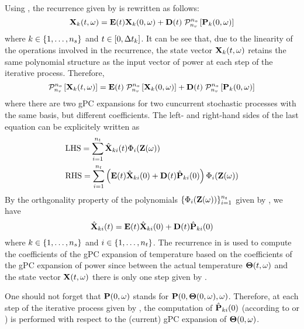 Using , the recurrence given by  is rewritten as follows:
\[
  \vX_k(\t, \o) = \mE(\t) \vX_k(0, \o) + \mD(\t) \; \oPC{\vars}{\pcorder}{\vP_k(0, \o)}
\]
where $k \in \{ 1, \dotsc, {n_s} \}$ and $t \in [0, \Delta t_k]$. It can be see that, due to the linearity of the operations involved in the recurrence, the state vector $\mathbf{X}_k(t, \omega)$ retains the same polynomial structure as the input vector of power at each step of the iterative process. Therefore,
\[
  \oPC{\vars}{\pcorder}{\vX_k(\t, \o)} = \mE(\t) \; \oPC{\vars}{\pcorder}{\vX_k(0, \o)} + \mD(\t) \; \oPC{\vars}{\pcorder}{\vP_k(0, \o)}
\]
where there are two gPC expansions for two cuncurrent stochastic processes with the same basis, but different coefficients. The left- and right-hand sides of the last equation can be explicitely written as
\begin{align*}
  & \text{LHS} = \sum_{i = 1}^{\pcterms} \pcc{\vX}_{ki}(\t) \pcb_i(\vZ(\o)) \\
  & \text{RHS} = \sum_{i = 1}^{\pcterms} \left( \mE(\t) \pcc{\vX}_{ki}(0) + \mD(\t) \pcc{\vP}_{ki}(0) \right) \pcb_i(\vZ(\o))
\end{align*}
By the orthgonality property of the polynomials $\{ \Phi_i(\mathbf{Z}(\omega)) \}_{i = 1}^{{n_t}}$ given by , we have
\begin{equation} \elabel{pc-recurrence}
  \pcc{\vX}_{ki}(\t) = \mE(\t) \pcc{\vX}_{ki}(0) + \mD(\t) \pcc{\vP}_{ki}(0)
\end{equation}
where $k \in \{ 1, \dots, {n_s} \}$ and $i \in \{ 1, \dotsc, {n_t} \}$. The recurrence in  is used to compute the coefficients of the gPC expansion of temperature based on the coefficients of the gPC expansion of power since between the actual temperature ${\boldsymbol\Theta}(t, \omega)$ and the state vector $\mathbf{X}(t, \omega)$ there is only one step given by .

One should not forget that $\mathbf{P}(0, \omega)$ stands for $\mathbf{P}(0, {\boldsymbol\Theta}(0, \omega), \omega)$. Therefore, at each step of the iterative process given by , the computation of $\hat{\mathbf{P}}_{ki}(0)$ (according to  or ) is performed with respect to the (current) gPC expansion of ${\boldsymbol\Theta}(0, \omega)$.
